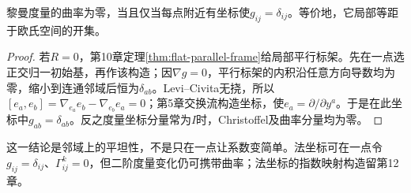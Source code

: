 \begin{proposition}[黎曼平坦的局部含义]\label{prop:riemannian-flat}
黎曼度量的曲率为零，当且仅当每点附近有坐标使$g_{ij}=\delta_{ij}$。等价地，它局部等距于欧氏空间的开集。
\end{proposition}
\begin{proof}
若$R=0$，第10章定理\ref{thm:flat-parallel-frame}给局部平行标架。先在一点选正交归一初始基，再作该构造；因$\nabla g=0$，平行标架的内积沿任意方向导数均为零，缩小到连通邻域后恒为$\delta_{ab}$。Levi--Civita无挠，所以$[e_a,e_b]=\nabla_{e_a}e_b-\nabla_{e_b}e_a=0$；第5章交换流构造坐标，使$e_a=\partial/\partial y^a$。于是在此坐标中$g_{ab}=\delta_{ab}$。反之度量坐标分量常为$I$时，Christoffel及曲率分量均为零。
\end{proof}

这一结论是邻域上的平坦性，不是只在一点让系数变简单。法坐标可在一点令$g_{ij}=\delta_{ij}$、$\Gamma^k_{ij}=0$，但二阶度量变化仍可携带曲率；法坐标的指数映射构造留第12章。
